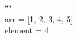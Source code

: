 \documentclass[preview]{standalone}
\begin{document}
```\\arr = [1, 2, 3, 4, 5]\\element = 4\\
\end{document}
